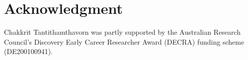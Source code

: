 \documentclass[10pt,journal,compsoc]{IEEEtran}
\begin{document}

















% 





\section*{Acknowledgment}
Chakkrit Tantithamthavorn was partly supported by the Australian Research Council’s Discovery Early Career Researcher Award (DECRA) funding scheme (DE200100941).



\appendices






\ifCLASSOPTIONcaptionsoff
  \newpage
\fi
\end{document}
